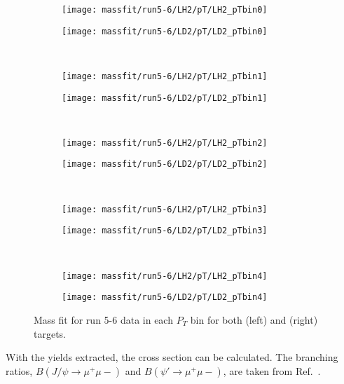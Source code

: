 \documentclass[../main.tex]{subfiles}
\begin{document}
\begin{figure}[h]
	\centering
	\begin{subfigure}{0.4\linewidth}
		\texttt{[image: massfit/run5-6/LH2/pT/LH2\_pTbin0]}
	\end{subfigure}
	\begin{subfigure}{0.4\linewidth}
		\texttt{[image: massfit/run5-6/LD2/pT/LD2\_pTbin0]}
	\end{subfigure}\\
	\begin{subfigure}{0.4\linewidth}
		\texttt{[image: massfit/run5-6/LH2/pT/LH2\_pTbin1]}
	\end{subfigure}
	\begin{subfigure}{0.4\linewidth}
		\texttt{[image: massfit/run5-6/LD2/pT/LD2\_pTbin1]}
	\end{subfigure}\\
	\begin{subfigure}{0.4\linewidth}
		\texttt{[image: massfit/run5-6/LH2/pT/LH2\_pTbin2]}
	\end{subfigure}
	\begin{subfigure}{0.4\linewidth}
		\texttt{[image: massfit/run5-6/LD2/pT/LD2\_pTbin2]}
	\end{subfigure}\\
	\begin{subfigure}{0.4\linewidth}
		\texttt{[image: massfit/run5-6/LH2/pT/LH2\_pTbin3]}
	\end{subfigure}
	\begin{subfigure}{0.4\linewidth}
		\texttt{[image: massfit/run5-6/LD2/pT/LD2\_pTbin3]}
	\end{subfigure}\\
	\begin{subfigure}{0.4\linewidth}
		\texttt{[image: massfit/run5-6/LH2/pT/LH2\_pTbin4]}
	\end{subfigure}
	\begin{subfigure}{0.4\linewidth}
		\texttt{[image: massfit/run5-6/LD2/pT/LD2\_pTbin4]}
	\end{subfigure}
	\caption{Mass fit for run 5-6 data in each $P_T$ bin for both (left) and (right) targets. }
	\label{fig:massfit_5-6_pT}
\end{figure}

With the yields extracted, the cross section can be calculated.
The branching ratios, $B\left(J/\psi\to\mu^+\mu-\right)$
and $B\left(\psi'\to\mu^+\mu-\right)$, are taken from Ref.~\cite{workman2022}.
\end{document}
